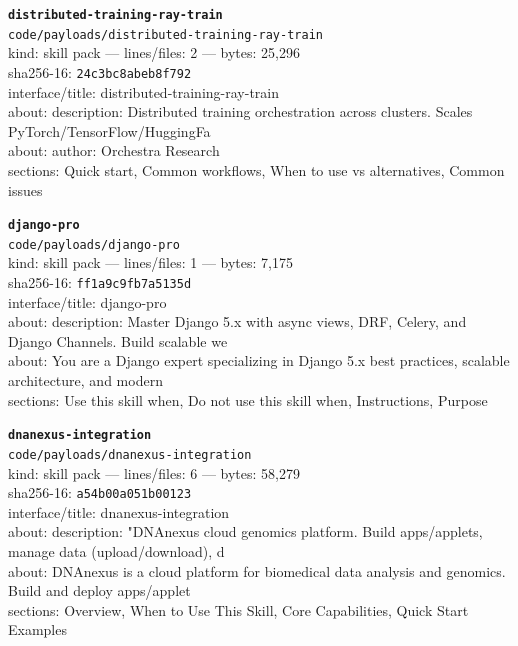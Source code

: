\noindent\textbf{\texttt{distributed-training-ray-train}}\\
\texttt{code/payloads/distributed-training-ray-train}\\
kind: skill pack --- lines/files: 2 --- bytes: 25,296\\
sha256-16: \texttt{24c3bc8abeb8f792}\\
interface/title: distributed-training-ray-train\\
about: description: Distributed training orchestration across clusters. Scales PyTorch/TensorFlow/HuggingFa\\
about: author: Orchestra Research\\
sections: Quick start, Common workflows, When to use vs alternatives, Common issues\\
\vspace*{6.0pt}

\noindent\textbf{\texttt{django-pro}}\\
\texttt{code/payloads/django-pro}\\
kind: skill pack --- lines/files: 1 --- bytes: 7,175\\
sha256-16: \texttt{ff1a9c9fb7a5135d}\\
interface/title: django-pro\\
about: description: Master Django 5.x with async views, DRF, Celery, and Django Channels. Build scalable we\\
about: You are a Django expert specializing in Django 5.x best practices, scalable architecture, and modern\\
sections: Use this skill when, Do not use this skill when, Instructions, Purpose\\
\vspace*{6.0pt}
\newpage

\noindent\textbf{\texttt{dnanexus-integration}}\\
\texttt{code/payloads/dnanexus-integration}\\
kind: skill pack --- lines/files: 6 --- bytes: 58,279\\
sha256-16: \texttt{a54b00a051b00123}\\
interface/title: dnanexus-integration\\
about: description: "DNAnexus cloud genomics platform. Build apps/applets, manage data (upload/download), d\\
about: DNAnexus is a cloud platform for biomedical data analysis and genomics. Build and deploy apps/applet\\
sections: Overview, When to Use This Skill, Core Capabilities, Quick Start Examples\\
\vspace*{6.0pt}

